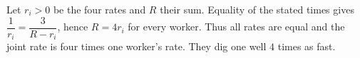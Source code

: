 Let $r_i>0$ be the four rates and $R$ their sum. Equality of the stated times gives $\dfrac{1}{r_i}=\dfrac{3}{R-r_i}$, hence $R=4r_i$ for every worker. Thus all rates are equal and the joint rate is four times one worker's rate. They dig one well $\boxed4$ times as fast.
